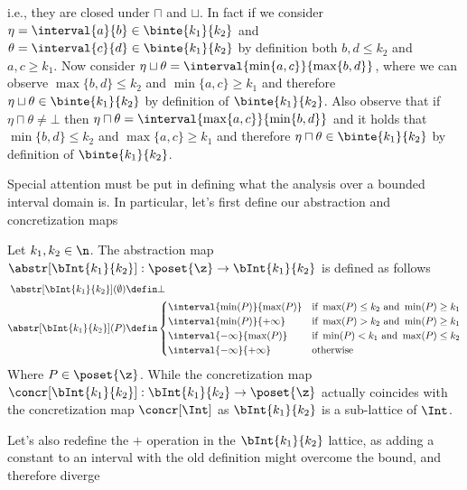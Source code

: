 i.e., they are closed under \(\sqcap\) and \(\sqcup\). In fact if we
consider \({\eta = \interval{a}{b} \in \binte{k_1}{k_2}}\) and
\({\theta = \interval{c}{d} \in \binte{k_1}{k_2}}\) by definition both
\(b,d \leq k_2\) and \(a,c \geq k_1\). Now consider
\({\eta \sqcup \theta = \interval{\min\{a,c\}}{\max\{b,d\}}}\), where
we can observe \(\max\{b,d\} \leq k_2\) and \(\min\{a,c\} \geq k_1\)
and therefore \({\eta \sqcup \theta \in \binte{k_1}{k_2}}\) by
definition of \(\binte{k_1}{k_2}\).  Also observe that if
\(\eta \sqcap \theta \neq \bot\) then
\({\eta \sqcap \theta = \interval{\max\{a,c\}}{\min\{b,d\}}}\) and it
holds that \({\min\{b,d\} \leq k_2}\) and \({\max\{a,c\} \geq k_1}\)
and therefore \({\eta \sqcap \theta \in \binte{k_1}{k_2}}\) by definition of
\(\binte{k_1}{k_2}\).

\medskip

\noindent
Special attention must be put in defining what the analysis over a
bounded interval domain is. In particular, let's first define our
abstraction and concretization maps

\begin{definition}\label{def:boundedac}
  Let \(k_1, k_2\in\n\). The abstraction map
  \({\abstr[\bInt{k_1}{k_2}] : \poset{\z} \to \bInt{k_1}{k_2}}\) is
  defined as follows
  \begin{align*}
    \abstr[\bInt{k_1}{k_2}](\emptyset) & \defin \bot \\
    \abstr[\bInt{k_1}{k_2}](P) & \defin \begin{cases}
      \interval{\min(P)}{\max(P)} & \text{if } \max(P) \leq k_2 \text{ and } \min(P) \geq k_1\\
      \interval{\min(P)}{+\infty} & \text{if } \max(P) > k_2 \text{ and } \min(P) \geq k_1 \\
      \interval{-\infty}{\max(P)} & \text{if } \min(P) < k_1 \text{ and } \max(P) \leq k_2 \\
      \interval{-\infty}{+\infty} & \text{otherwise}
    \end{cases}
  \end{align*}
  Where \(P\in\poset{\z}\). While the concretization map
  \({\concr[\bInt{k_1}{k_2}] : \bInt{k_1}{k_2} \to \poset{\z}}\)
  actually coincides with the concretization map \(\concr[\Int]\) as
  \(\bInt{k_1}{k_2}\) is a sub-lattice of \(\Int\).
\end{definition}

Let's also redefine the \(+\) operation in the \(\bInt{k_1}{k_2}\)
lattice, as adding a constant to an interval with the old definition
might overcome the bound, and therefore diverge

